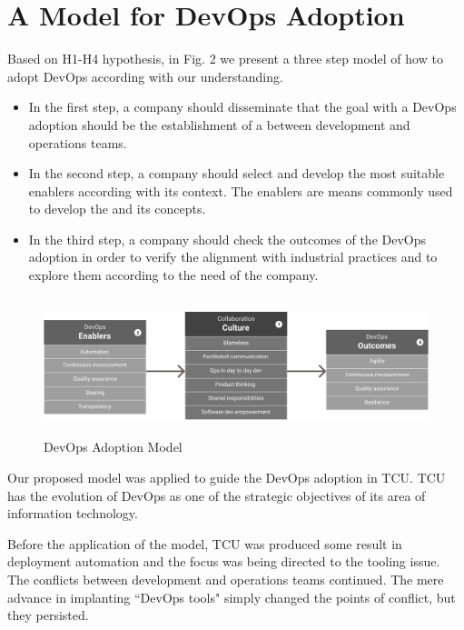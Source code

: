 \section{A Model for DevOps Adoption}\label{sec:case_study}

Based on H1-H4 hypothesis, in Fig. 2 we present a three step model of how to
adopt DevOps according with our understanding.

\begin{itemize}
\item In the first step, a company should
disseminate that the goal with a DevOps adoption should be
the establishment of a  between
development and operations teams.

\item In the second step, a company should select and develop
the most suitable enablers according with its context. The enablers
are means commonly used to develop the 
and its concepts.

\item In the third step, a company should check the outcomes of the
DevOps adoption in order to verify the alignment with
industrial practices and to explore them according to the
need of the company.
\end{itemize}

\begin{figure}[H]
  \centering
    \includegraphics[width=14.26cm,height=4cm,natwidth=1116,natheight=313]{model.png}
    \caption{DevOps Adoption Model}
    \label{fig2}
\end{figure}


Our proposed model was applied to guide the DevOps adoption in TCU. TCU has the
evolution of DevOps as one of the strategic objectives of its area of
information technology.

Before the application of the model, TCU was produced some result in deployment
automation and the focus was being directed to the tooling issue. The conflicts
between development and operations teams continued. The mere advance in
implanting ``DevOps tools" simply changed the points of conflict, but they
persisted.

